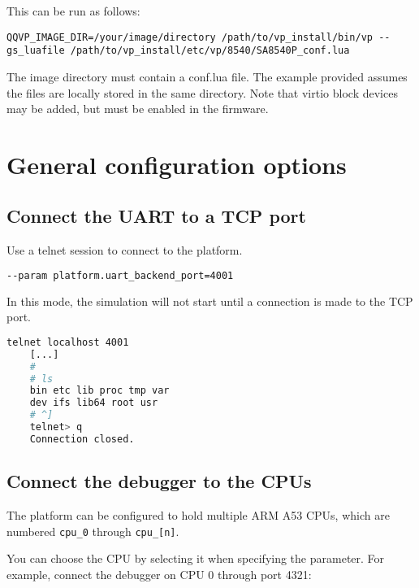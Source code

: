 This can be run as follows:

{\small{\lstinline!QQVP_IMAGE_DIR=/your/image/directory /path/to/vp_install/bin/vp --gs_luafile /path/to/vp_install/etc/vp/8540/SA8540P_conf.lua!}}

The image directory must contain a conf.lua file. The example provided assumes
the files are locally stored in the same directory. Note that
virtio block devices may be added, but must be enabled in the firmware.

\clearpage
\section{General configuration options}

\subsection{Connect the UART to a TCP port}

Use a telnet session to connect to the platform. \leavevmode

\small
\begin{lstlisting}[language=bash]
    --param platform.uart_backend_port=4001
\end{lstlisting}
\normalsize

In this mode, the simulation will not start until a connection is made to the TCP port.

\small
\begin{lstlisting}[language=bash]
    telnet localhost 4001
    [...]
    #
    # ls
    bin etc lib proc tmp var
    dev ifs lib64 root usr
    # ^]
    telnet> q
    Connection closed.
\end{lstlisting}
\normalsize


\subsection{Connect the debugger to the CPUs}
\label{sec:connect-debugger-cpus}

The platform can be configured to hold multiple ARM A53 CPUs, which are numbered {\small{\lstinline!cpu_0!}} through {\small{\lstinline!cpu_[n]!}}.

You can choose the CPU by selecting it when specifying the parameter. For example, connect the debugger on CPU 0 through port 4321:

